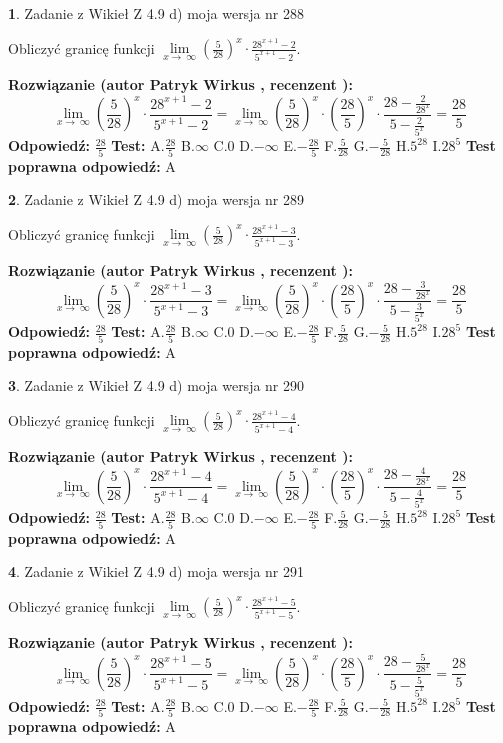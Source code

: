 \documentclass[12pt, a4paper]{article}
\theoremstyle{definition} %
\newtheorem{zad}{}
\newcommand{\zadStart}[1]{\begin{zad}#1\newline}
\newcommand{\zadStop}{\end{zad}}
\newcommand{\rozwStart}[2]{\noindent \textbf{Rozwiązanie (autor #1 , recenzent #2): }\newline}
\newcommand{\rozwStop}{\newline}
\newcommand{\odpStart}{\noindent \textbf{Odpowiedź:}\newline}
\newcommand{\odpStop}{\newline}
\newcommand{\testStart}{\noindent \textbf{Test:}\newline}
\newcommand{\testStop}{\newline}
\newcommand{\kluczStart}{\noindent \textbf{Test poprawna odpowiedź:}\newline}
\newcommand{\kluczStop}{\newline}
\begin{document}
\zadStart{Zadanie z Wikieł Z 4.9 d) moja wersja nr 288}


Obliczyć granicę funkcji  $\lim\limits_{x\to\ \infty}(\frac{5}{28})^{x}\cdot\frac{28^{x+1}-2}{5^{x+1}-2}$.
\zadStop
\rozwStart{Patryk Wirkus}{}
$$\lim\limits_{x\to\ \infty}(\frac{5}{28})^{x}\cdot\frac{28^{x+1}-2}{5^{x+1}-2}=\lim\limits_{x\to\ \infty}(\frac{5}{28})^{x}\cdot(\frac{28}{5})^{x} \cdot \frac{28-\frac{2}{28^{x}}}{5-\frac{2}{5^{x}}} = \frac{28}{5}$$
\rozwStop
\odpStart
$\frac{28}{5}$
\odpStop
\testStart
A.$\frac{28}{5}$ B.$\infty$ C.$0$ D.$-\infty$ E.$-\frac{28}{5}$
F.$\frac{5}{28}$ G.$-\frac{5}{28}$
H.$5^{28}$
I.$28^{5}$
\testStop
\kluczStart
A
\kluczStop



\zadStart{Zadanie z Wikieł Z 4.9 d) moja wersja nr 289}


Obliczyć granicę funkcji  $\lim\limits_{x\to\ \infty}(\frac{5}{28})^{x}\cdot\frac{28^{x+1}-3}{5^{x+1}-3}$.
\zadStop
\rozwStart{Patryk Wirkus}{}
$$\lim\limits_{x\to\ \infty}(\frac{5}{28})^{x}\cdot\frac{28^{x+1}-3}{5^{x+1}-3}=\lim\limits_{x\to\ \infty}(\frac{5}{28})^{x}\cdot(\frac{28}{5})^{x} \cdot \frac{28-\frac{3}{28^{x}}}{5-\frac{3}{5^{x}}} = \frac{28}{5}$$
\rozwStop
\odpStart
$\frac{28}{5}$
\odpStop
\testStart
A.$\frac{28}{5}$ B.$\infty$ C.$0$ D.$-\infty$ E.$-\frac{28}{5}$
F.$\frac{5}{28}$ G.$-\frac{5}{28}$
H.$5^{28}$
I.$28^{5}$
\testStop
\kluczStart
A
\kluczStop



\zadStart{Zadanie z Wikieł Z 4.9 d) moja wersja nr 290}


Obliczyć granicę funkcji  $\lim\limits_{x\to\ \infty}(\frac{5}{28})^{x}\cdot\frac{28^{x+1}-4}{5^{x+1}-4}$.
\zadStop
\rozwStart{Patryk Wirkus}{}
$$\lim\limits_{x\to\ \infty}(\frac{5}{28})^{x}\cdot\frac{28^{x+1}-4}{5^{x+1}-4}=\lim\limits_{x\to\ \infty}(\frac{5}{28})^{x}\cdot(\frac{28}{5})^{x} \cdot \frac{28-\frac{4}{28^{x}}}{5-\frac{4}{5^{x}}} = \frac{28}{5}$$
\rozwStop
\odpStart
$\frac{28}{5}$
\odpStop
\testStart
A.$\frac{28}{5}$ B.$\infty$ C.$0$ D.$-\infty$ E.$-\frac{28}{5}$
F.$\frac{5}{28}$ G.$-\frac{5}{28}$
H.$5^{28}$
I.$28^{5}$
\testStop
\kluczStart
A
\kluczStop



\zadStart{Zadanie z Wikieł Z 4.9 d) moja wersja nr 291}


Obliczyć granicę funkcji  $\lim\limits_{x\to\ \infty}(\frac{5}{28})^{x}\cdot\frac{28^{x+1}-5}{5^{x+1}-5}$.
\zadStop
\rozwStart{Patryk Wirkus}{}
$$\lim\limits_{x\to\ \infty}(\frac{5}{28})^{x}\cdot\frac{28^{x+1}-5}{5^{x+1}-5}=\lim\limits_{x\to\ \infty}(\frac{5}{28})^{x}\cdot(\frac{28}{5})^{x} \cdot \frac{28-\frac{5}{28^{x}}}{5-\frac{5}{5^{x}}} = \frac{28}{5}$$
\rozwStop
\odpStart
$\frac{28}{5}$
\odpStop
\testStart
A.$\frac{28}{5}$ B.$\infty$ C.$0$ D.$-\infty$ E.$-\frac{28}{5}$
F.$\frac{5}{28}$ G.$-\frac{5}{28}$
H.$5^{28}$
I.$28^{5}$
\testStop
\kluczStart
A
\kluczStop
\end{document}
